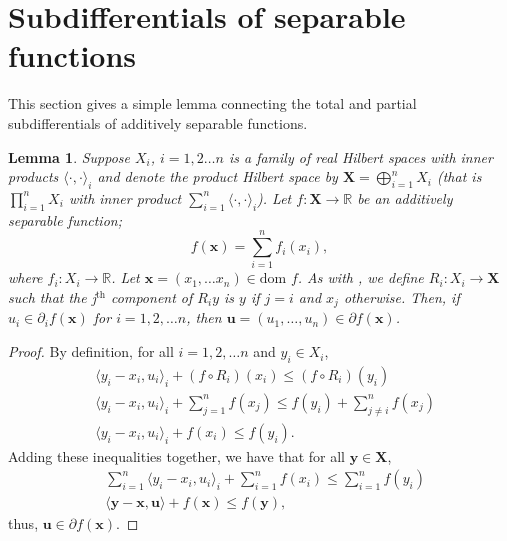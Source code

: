\documentclass[11pt]{article}
\newtheorem{lemma}{Lemma}
\newcommand\inner[2]{\langle #1, #2 \rangle}
\newcommand{\R}{\mathbb{R}}
\begin{document}
		\section{Subdifferentials of separable functions}
		This section gives a simple lemma connecting the total and partial subdifferentials of additively separable functions.
		\begin{lemma}
			 Suppose $X_i$, $i=1,2\ldots n$ is a family of real Hilbert spaces with inner products $\inner{\cdot}{\cdot}_i$ and denote the product Hilbert space by $\bm{X}=\bigoplus_{i=1}^{n}X_i$ (that is $\prod_{i=1}^{n}X_i$ with inner product $\sum_{i=1}^{n}\inner{\cdot}{\cdot}_i$). Let $f:\bm{X}\to\R$ be an additively separable function;
			\[  f(\bm{x}) = \sum_{i=1}^{n}f_{i}(x_i),
			\]
			where $f_i:X_i\to\R$. Let $\bm{x}=(x_1, \ldots x_n)\in\text{dom }f$. As with \cite{Bauschke2010}, we define $R_i:X_i\to \bm{X}$ such that the j$^{\text{th}}$ component of $R_i y$ is $y$ if $j=i$ and $x_j$ otherwise. Then, if $u_i\in\partial_i f(\bm{x})$ for $i=1,2,\ldots n$, then $\bm{u}=(u_1, \ldots, u_n)\in\partial f(\bm{x})$.
			\end{lemma}
		 \begin{proof}
			By definition, for all $i=1,2,\ldots n$ and $y_i\in X_i$,
			\begin{align*}
				& \inner{y_i - x_i}{u_i}_i + (f\circ R_i)(x_i)\leq (f\circ R_i)(y_i)\\
				& \inner{y_i - x_i}{u_i}_i + \sum_{j=1}^{n}f(x_j) \leq f(y_i) + \sum_{j\neq i}^{n}f(x_j) \\
				& \inner{y_i - x_i}{u_i}_i + f(x_i) \leq f(y_i).
			\end{align*}
			Adding these inequalities together, we have that for all $\bm{y}\in\bm{X}$, 
			\begin{align*}
				& \sum_{i=1}^{n}\inner{y_i - x_i}{u_i}_i + \sum_{i=1}^{n}f(x_i) \leq \sum_{i=1}^{n}f(y_i) \\
				& \inner{\bm{y} - \bm{x}}{\bm{u}} + f(\bm{x}) \leq f(\bm{y}),
			\end{align*}
			thus, $\bm{u}\in \partial f(\bm{x})$.
		\end{proof}
	\printbibliography
\end{document}
